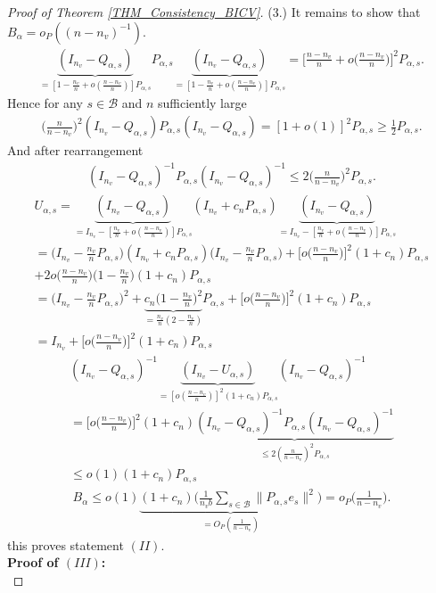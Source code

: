 \documentclass[Research_Module_ES.tex]{subfiles}
\begin{document}
\begin{proof}[Proof of Theorem \ref{THM_Consistency_BICV}]
	(3.) It remains to show that $B_\alpha = o_P((n-n_v)^{-1})$.
	\begin{align*}
	\underbrace{(I_{n_v}-Q_{\alpha,s})}_{=[1-\frac{n_v}{n}+o(\frac{n-n_v}{n})]P_{\alpha,s}} P_{\alpha,s}\underbrace{(I_{n_v}-Q_{\alpha,s})}_{=[1-\frac{n_v}{n}+o(\frac{n-n_v}{n})]P_{\alpha,s}} =\biggl[\frac{n-n_v}{n}+o\biggl(\frac{n-n_v}{n}\biggr)\biggr]^2 P_{\alpha,s}.
	\end{align*}
	Hence for any $s\in \mathcal{B}$ and $n$ sufficiently large
	\begin{align*}
	\biggl(\frac{n}{n-n_v}\biggr)^2 (I_{n_v}-Q_{\alpha,s})P_{\alpha,s}(I_{n_v}-Q_{\alpha,s})=[1+o(1)]^2P_{\alpha,s}\ge \frac{1}{2}P_{\alpha,s}.
	\end{align*}
	And after rearrangement
	\begin{align*}
	(I_{n_v}-Q_{\alpha,s})^{-1}P_{\alpha,s}(I_{n_v}-Q_{\alpha,s})^{-1}\le 2 \biggl(\frac{n}{n-n_v}\biggr)^2P_{\alpha,s}.
	\end{align*}
	\begin{align*}
	U_{\alpha,s} = \underbrace{(I_{n_v}-Q_{\alpha,s})}_{=I_{n_v}-[\frac{n_v}{n}+o(\frac{n-n_v}{n})]P_{\alpha,s}}(I_{n_v}+c_n P_{\alpha,s})\underbrace{(I_{n_v}-Q_{\alpha,s})}_{=I_{n_v}-[\frac{n_v}{n}+o(\frac{n-n_v}{n})]P_{\alpha,s}}\\
	=\biggl(I_{n_v}-\frac{n_v}{n}P_{\alpha,s}\biggr)(I_{n_v}+c_n P_{\alpha,s})\biggl(I_{n_v}-\frac{n_v}{n}P_{\alpha,s}\biggr)
	+\biggl[o\biggl(\frac{n-n_v}{n}\biggr)\biggr]^2(1+c_n)P_{\alpha,s} \\
	+ 2o\biggl(\frac{n-n_v}{n}\biggr)\biggl(1-\frac{n_v}{n}\biggr)(1+c_n)P_{\alpha,s}\\
	=\biggl(I_{n_v}-\frac{n_v}{n}P_{\alpha,s}\biggr)^2+\underbrace{c_n\biggl(1-\frac{n_v}{n}\biggr)^2}_{=\frac{n_v}{n}(2-\frac{n_v}{n})}P_{\alpha,s}+\biggl[o\biggl(\frac{n-n_v}{n}\biggr)\biggr]^2(1+c_n)P_{\alpha,s}\\
	=I_{n_v} +\biggl[o\biggl(\frac{n-n_v}{n}\biggr)\biggr]^2(1+c_n)P_{\alpha,s}
	\end{align*}
	\begin{align*}
	(I_{n_v}-Q_{\alpha,s})^{-1}\underbrace{(I_{n_v}-U_{\alpha,s})}_{=[o(\frac{n-n_v}{n})]^2(1+c_n)P_{\alpha,s}}(I_{n_v}-Q_{\alpha,s})^{-1}\\
	=\biggl[o\biggl(\frac{n-n_v}{n}\biggr)\biggr]^2(1+c_n)\underbrace{(I_{n_v}-Q_{\alpha,s})^{-1}P_{\alpha,s}(I_{n_v}-Q_{\alpha,s})^{-1}}_{\le 2(\frac{n}{n-n_v})^2P_{\alpha,s}}\\
	\le o(1)(1+c_n)P_{\alpha,s}
	\end{align*}
	\begin{align*}
	B_\alpha \le o(1)\underbrace{(1+c_n)\biggl(\frac{1}{n_vb}\sum_{s\in \mathcal{B}}\lVert P_{\alpha,s}e_s\rVert^2\biggr)}_{=O_P(\frac{1}{n-n_v})}=o_P\biggl(\frac{1}{n-n_v}\biggr).
	\end{align*}
	this proves statement $(II)$.\\
	
	\textbf{Proof of $(III)$:} \\
\end{proof}
\end{document}
